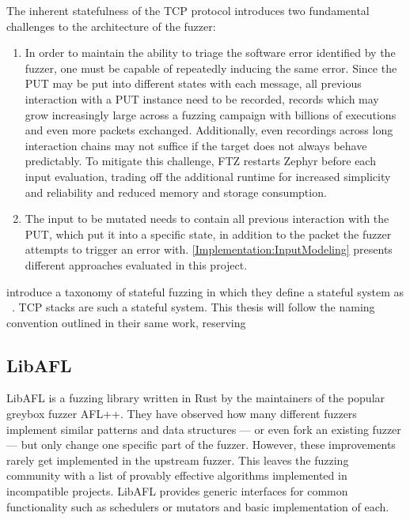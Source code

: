 \documentclass[twocolumn]{article}
\newcommand{\proj}{FTZ\xspace}
\let\savedCite=\cite
\renewcommand{\cite}{\unskip~\savedCite}
\begin{document}
The inherent statefulness of the TCP protocol introduces two fundamental challenges to the architecture of the fuzzer:
\begin{enumerate}
  \item In order to maintain the ability to triage the software error identified by the fuzzer, one must be capable of repeatedly inducing the same error. Since the PUT may be put into different states with each message, all previous interaction with a PUT instance need to be recorded, records which may grow increasingly large across a fuzzing campaign with billions of executions and even more packets exchanged. Additionally, even recordings across long interaction chains may not suffice if the target does not always behave predictably. To mitigate this challenge, \proj restarts Zephyr before each input evaluation, trading off the additional runtime for increased simplicity and reliability and reduced memory and storage consumption.
  \item The input to be mutated needs to contain all previous interaction with the PUT, which put it into a specific state, in addition to the packet the fuzzer attempts to trigger an error with. \cref{Implementation:InputModeling} presents different approaches evaluated in this project.
\end{enumerate}

\citeauthor{StatefulReview} introduce a taxonomy of stateful fuzzing in which they define a stateful system as \cite{StatefulReview}. TCP stacks are such a stateful system. This thesis will follow the naming convention outlined in their same work, reserving \cite{StatefulReview}

\subsection{LibAFL}

LibAFL is a fuzzing library written in Rust by the maintainers of the popular greybox fuzzer AFL++. They have observed how many different fuzzers implement similar patterns and data structures — or even fork an existing fuzzer — but only change one specific part of the fuzzer. However, these improvements rarely get implemented in the upstream fuzzer. This leaves the fuzzing community with a list of provably effective algorithms implemented in incompatible projects. LibAFL provides generic interfaces for common functionality such as schedulers or mutators and basic implementation of each.
\end{document}
